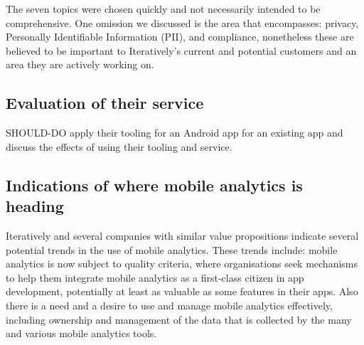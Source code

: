 The seven topics were chosen quickly and not necessarily intended to be comprehensive. One omission we discussed is the area that encompasses: privacy, Personally Identifiable Information (PII), and compliance, nonetheless these are believed to be important to Iteratively's current and potential customers and an area they are actively working on.

\subsection{Evaluation of their service}
SHOULD-DO apply their tooling for an Android app for an existing app and discuss the effects of using their tooling and service. %

\subsection{Indications of where mobile analytics is heading}
Iteratively and several companies with similar value propositions indicate several potential trends in the use of mobile analytics. These trends include: mobile analytics is now subject to quality criteria, where organisations seek mechanisms to help them integrate mobile analytics as a first-class citizen in app development, potentially at least as valuable as some features in their apps. Also there is a need and a desire to use and manage mobile analytics effectively, including ownership and management of the data that is collected by the many and various mobile analytics tools. 


